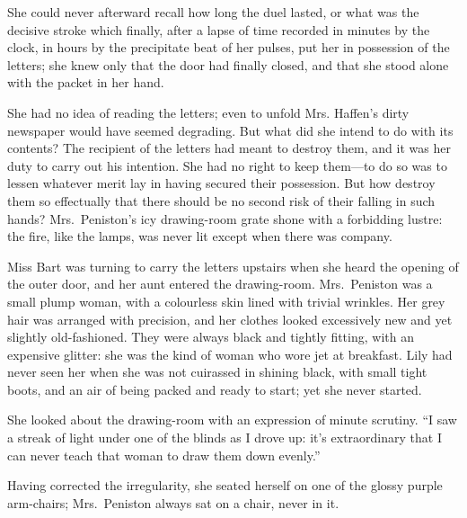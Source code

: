 \documentclass[12pt,a4paper]{book}
\begin{document}
She could never afterward recall how long the duel lasted, or
what was the decisive stroke which finally, after a lapse of time
recorded in minutes by the clock, in hours by the precipitate
beat of her pulses, put her in possession of the letters; she
knew only that the door had finally closed, and that she stood
alone with the packet in her hand.





She had no idea of reading the letters; even to unfold Mrs.
Haffen's dirty newspaper would have seemed degrading. But what
did she intend to do with its contents? The recipient of the
letters had meant to destroy them, and it was her duty to carry
out his intention. She had no right to keep them---to do so was to
lessen whatever merit lay in having secured their possession. But
how destroy them so effectually that there should be no second
risk of their falling in such hands? Mrs.\ Peniston's icy
drawing-room grate shone with a forbidding lustre: the fire, like
the lamps, was never lit except when there was company.





Miss Bart was turning to carry the letters upstairs when she
heard the opening of the outer door, and her aunt entered the
drawing-room. Mrs.\ Peniston was a small plump woman, with a
colourless skin lined with trivial wrinkles. Her grey hair was
arranged with precision, and her clothes looked excessively new
and yet slightly old-fashioned. They were always black and
tightly fitting, with an expensive glitter: she was the kind of
woman who wore jet at breakfast. Lily had never seen her when she
was not cuirassed in shining black, with small tight boots, and
an air of being packed and ready to start; yet she never started.





She looked about the drawing-room with an expression of minute
scrutiny. ``I saw a streak of light under one of the blinds as I
drove up: it's extraordinary that I can never teach that woman to
draw them down evenly.''





Having corrected the irregularity, she seated herself on one of
the glossy purple arm-chairs; Mrs.\ Peniston always sat on a
chair, never in it.
\end{document}
